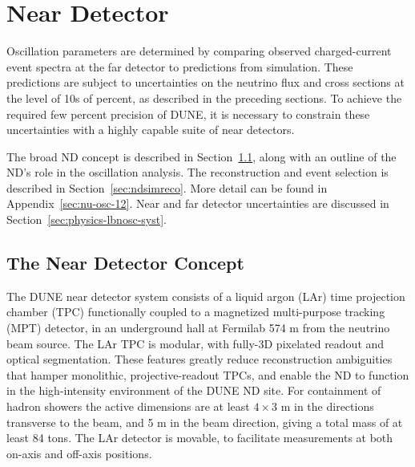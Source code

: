 \section{Near Detector}\label{sec:nu-osc-06}\label{sec:physics-lbnosc-ND}


Oscillation parameters are determined by comparing observed charged-current event spectra at the far detector to predictions from simulation. These predictions are subject to uncertainties on the neutrino flux and cross sections at the level of 10s of percent, as described in the preceding sections. To achieve the required few percent precision of DUNE, it is necessary to constrain these uncertainties with a highly capable suite of near detectors.

The broad ND concept is described in Section~\ref{sec:ndconcept}, along with an outline of the ND's role in the oscillation analysis. The reconstruction and event selection is described in Section~\ref{sec:ndsimreco}. More detail can be found in Appendix~\ref{sec:nu-osc-12}. Near and far detector uncertainties are discussed in Section~\ref{sec:physics-lbnosc-syst}.

\subsection{The Near Detector Concept}
\label{sec:ndconcept}

The DUNE near detector system consists of a liquid argon (LAr) time projection chamber (TPC) functionally coupled to a magnetized multi-purpose tracking (MPT) detector, in an underground hall at Fermilab 574 m from the neutrino beam source. The LAr TPC is modular, with fully-3D pixelated readout and optical segmentation. These features greatly reduce reconstruction ambiguities that hamper monolithic, projective-readout TPCs, and enable the ND to function in the high-intensity environment of the DUNE ND site. For containment of hadron showers the active dimensions are at least $4 \times 3$ m in the directions transverse to the beam, and 5 m in the beam direction, giving a total mass of at least 84 tons. The LAr detector is movable, to facilitate measurements at both on-axis and off-axis positions.

